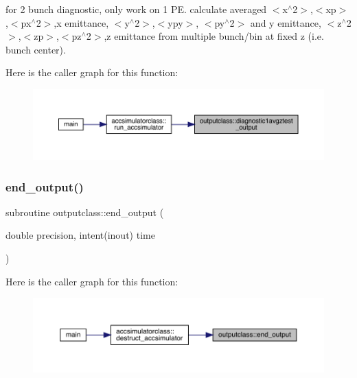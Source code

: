 for 2 bunch diagnostic, only work on 1 PE. calculate averaged $<$x$^\wedge$2$>$,$<$xp$>$,$<$px$^\wedge$2$>$,x emittance, $<$y$^\wedge$2$>$,$<$ypy$>$, $<$py$^\wedge$2$>$ and y emittance, $<$z$^\wedge$2$>$,$<$zp$>$,$<$pz$^\wedge$2$>$,z emittance from multiple bunch/bin at fixed z (i.\+e. bunch center). 

Here is the caller graph for this function\+:\nopagebreak
\begin{figure}[H]
\begin{center}
\leavevmode
\includegraphics[width=350pt]{namespaceoutputclass_a17a23eedc331f6e6b2ca0543119aca42_icgraph}
\end{center}
\end{figure}
\mbox{\label{namespaceoutputclass_af40e04d104fbdb28b9cae7fb5fcba121}} 
\subsubsection{\texorpdfstring{end\_output()}{end\_output()}}
{\footnotesize\ttfamily subroutine outputclass\+::end\+\_\+output (\begin{DoxyParamCaption}\item[{double precision, intent(inout)}]{time }\end{DoxyParamCaption})}

Here is the caller graph for this function\+:\nopagebreak
\begin{figure}[H]
\begin{center}
\leavevmode
\includegraphics[width=350pt]{namespaceoutputclass_af40e04d104fbdb28b9cae7fb5fcba121_icgraph}
\end{center}
\end{figure}
\mbox{\label{namespaceoutputclass_a9fcc4b33aa3d9bee76ef32e6708293b1}} 
